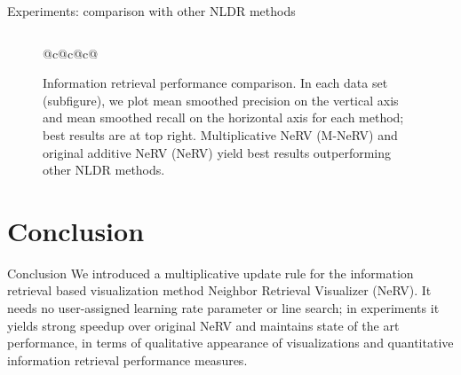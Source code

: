 \documentclass[first=dgreen,second=purple,logo=yellowexc]{aaltoslides}
\begin{document}
\begin{frame}{Experiments: comparison with other NLDR methods}
\begin{figure}[!htb]
\begin{columns}
\begin{column}{0.65\textwidth}
\begin{tabular}{{@{}c@{}c@{}c@{}}}
\end{tabular}
\end{column}
\begin{column}{0.25\textwidth}
\caption{\tiny{Information retrieval performance comparison. In each
  data set (subfigure), 
  we plot 
  mean smoothed precision on the vertical axis and
  mean smoothed recall on the horizontal axis for each method; best results are
  at top right. Multiplicative NeRV (M-NeRV) and original additive
  NeRV (NeRV) yield best results outperforming other NLDR
  methods.}}
\end{column}
\end{columns}
\label{fig:comparison}
\end{figure}
\end{frame}

\section{Conclusion}
\begin{frame}{Conclusion}
We introduced a multiplicative update rule for the information retrieval based visualization method Neighbor Retrieval Visualizer (NeRV). It needs no user-assigned learning rate parameter or line search; in experiments it yields strong speedup over original NeRV and maintains state of the art performance, in terms of qualitative appearance of visualizations and quantitative information retrieval performance measures.
\end{frame}
\end{document}
